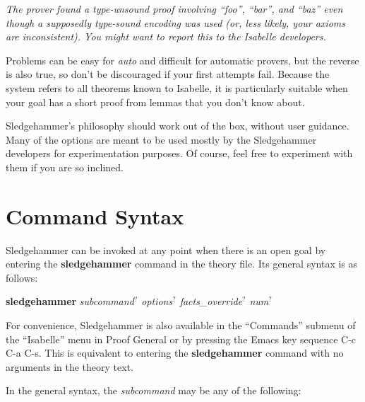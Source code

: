 \documentclass[a4paper,12pt]{article}
\begin{document}
\prew
\slshape
The prover found a type-unsound proof involving ``\textit{foo}'',
``\textit{bar}'', and ``\textit{baz}'' even though a supposedly type-sound
encoding was used (or, less likely, your axioms are inconsistent). You might
want to report this to the Isabelle developers.
\postw


Problems can be easy for \textit{auto} and difficult for automatic provers, but
the reverse is also true, so don't be discouraged if your first attempts fail.
Because the system refers to all theorems known to Isabelle, it is particularly
suitable when your goal has a short proof from lemmas that you don't know about.


Sledgehammer's philosophy should work out of the box, without user guidance.
Many of the options are meant to be used mostly by the Sledgehammer developers
for experimentation purposes. Of course, feel free to experiment with them if
you are so inclined.

\section{Command Syntax}
\label{command-syntax}

Sledgehammer can be invoked at any point when there is an open goal by entering
the \textbf{sledgehammer} command in the theory file. Its general syntax is as
follows:

\prew
\textbf{sledgehammer} \textit{subcommand\/$^?$ options\/$^?$ facts\_override\/$^?$ num\/$^?$}
\postw

For convenience, Sledgehammer is also available in the ``Commands'' submenu of
the ``Isabelle'' menu in Proof General or by pressing the Emacs key sequence C-c
C-a C-s. This is equivalent to entering the \textbf{sledgehammer} command with
no arguments in the theory text.

In the general syntax, the \textit{subcommand} may be any of the following:
\end{document}
